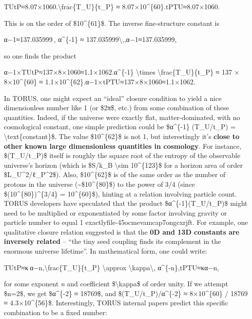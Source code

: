 \documentclass[]{article}
\begin{document}
TUtP≈8.07×1060.\textbackslash{}frac\{T\_U\}\{t\_P\} ≈
8.07×10\^{}\{60\}.tP​TU​​≈8.07×1060.

This is on the order of \$10\^{}\{61\}\$. The inverse fine-structure
constant is

α−1≈137.035999 , α\^{}\{-1\} ≈
137.035999\textbackslash{},,α−1≈137.035999,

so one finds the product

α−1×TUtP≈137×8×1060≈1.1×1062.α\^{}\{-1\} \textbackslash{}times
\textbackslash{}frac\{T\_U\}\{t\_P\} ≈ 137 × 8×10\^{}\{60\} ≈
1.1×10\^{}\{62\}.α−1×tP​TU​​≈137×8×1060≈1.1×1062.

In TORUS, one might expect an ``ideal'' closure condition to yield a
nice dimensionless number like 1 (or \$2π\$, etc.) from some combination
of these quantities​. Indeed, if the universe were exactly flat,
matter-dominated, with no cosmological constant, one simple prediction
could be \$α\^{}\{-1\} (T\_U/t\_P) = \textbackslash{}text\{constant\}\$.
The value \$10\^{}\{62\}\$ is not 1, but interestingly it's
\textbf{close to other known large dimensionless quantities in
cosmology}. For instance, \$(T\_U/t\_P)\$ itself is roughly the square
root of the entropy of the observable universe's horizon (which is
\$S/k\_B \textbackslash{}sim 10\^{}\{123\}\$ for a horizon area of order
\$L\_U\^{}2/ℓ\_P\^{}2\$)​. Also, \$10\^{}\{62\}\$ is of the same order
as the number of protons in the universe
(\textasciitilde{}\$10\^{}\{80\}\$) to the power of 3/4 (since
\$(10\^{}\{80\})\^{}\{3/4\} = 10\^{}\{60\}\$), hinting at a relation
involving particle count. TORUS developers have speculated that the
product \$α\^{}\{-1\}(T\_U/t\_P)\$ might need to be multiplied or
exponentiated by some factor involving gravity or particle number to
equal 1 exactly​file-45ocmevamcap7ongcxrjft. For example, one
qualitative closure relation suggested is that the \textbf{0D and 13D
constants are inversely related} -- ``the tiny seed coupling finds its
complement in the enormous universe lifetime''​. In mathematical form,
one could write:

TUtP≈κ α−n,\textbackslash{}frac\{T\_U\}\{t\_P\} \textbackslash{}approx
\textbackslash{}kappa\textbackslash{}, α\^{}\{-n\},tP​TU​​≈κα−n,

for some exponent \emph{n} and coefficient \$\textbackslash{}kappa\$ of
order unity​. If we attempt \$n=2\$, we get \$α\^{}\{-2\} ≈ 18769\$, and
\$(T\_U/t\_P)/α\^{}\{-2\} ≈ 8×10\^{}\{60\} / 18769 ≈ 4.3×10\^{}\{56\}\$.
Interestingly, TORUS internal papers predict this specific combination
to be a fixed number:
\end{document}
